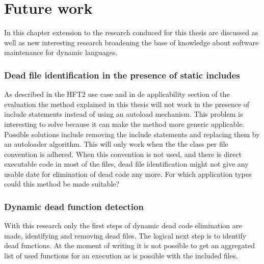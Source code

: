 \chapter{Future work}
\label{ch:future}


In this chapter extension to the research conduced for this thesis are discussed as well as new interesting research broadening the base of knowledge about software maintenance for dynamic languages.

\subsection*{Dead file identification in the presence of static includes}
As described in the HFT2 use case and in de applicability section of the evaluation the method explained in this thesis will not work in the presence of include statements instead of using an autoload mechanism. This problem is interesting to solve because it can make the method more generic applicable. Possible solutions include removing the include statements and replacing them by an autoloader algorithm. This will only work when the the class per file convention is adhered. When this convention is not used, and there is direct executable code in most of the files, dead file identification might not give any usable date for elimination of dead code any more. For which application types could this method be made suitable?

\subsection*{Dynamic dead function detection}
With this research only the first steps of dynamic dead code elimination are made, identifying and removing dead files. The logical next step is to identify dead functions. At the moment of writing it is not possible to get an aggregated list of used functions for an execution as is possible with the included files.

